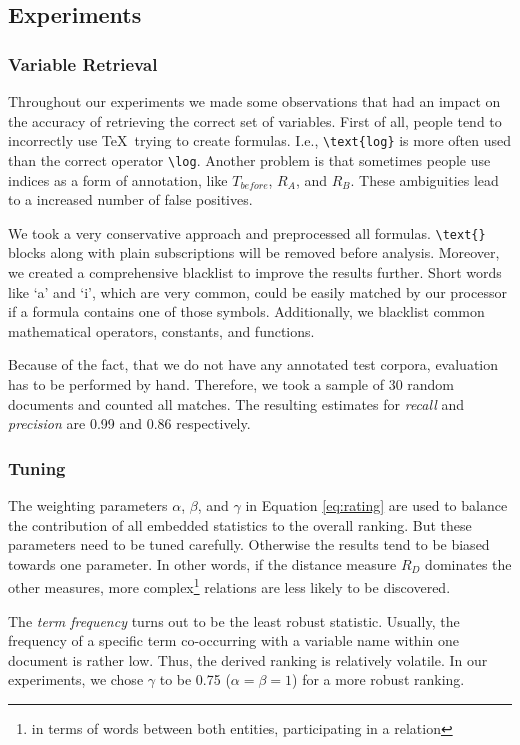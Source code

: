 \documentclass[runningheads]{llncs}
\begin{document}
\subsection{Experiments}

\subsubsection{Variable Retrieval}
\label{vr}
Throughout our experiments we made some observations that had an impact on the accuracy of retrieving the correct set of variables. First of all, people tend to incorrectly use \TeX\ trying to create formulas. I.e., \texttt{\textbackslash text\{log\}} is more often used than the correct operator \texttt{\textbackslash log}. Another problem is that sometimes people use indices as a form of annotation, like $T_{before}$, $R_{A}$, and $R_{B}$. These ambiguities lead to a increased number of false positives.

We took a very conservative approach and preprocessed all formulas. \texttt{\textbackslash text\{\}} blocks along with plain subscriptions will be removed before analysis. Moreover, we created a comprehensive blacklist to improve the results further. Short words like `a' and `i', which are very common, could be easily matched by our processor if a formula contains one of those symbols. Additionally, we blacklist common mathematical operators, constants, and functions.

Because of the fact, that we do not have any annotated test corpora, evaluation has to be performed by hand. Therefore, we took a sample of 30 random documents and counted all matches. The resulting estimates for \emph{recall} and \emph{precision} are 0.99 and 0.86 respectively.



\subsubsection{Tuning}
The weighting parameters $\alpha$, $\beta$, and $\gamma$ in Equation \ref{eq:rating} are used to balance the contribution of all embedded statistics to the overall ranking. But these parameters need to be tuned carefully. Otherwise the results tend to be biased towards one parameter. In other words, if the distance measure $R_{D}$ dominates the other measures, more complex\footnote{in terms of words between both entities, participating in a relation} relations are less likely to be discovered.

The \emph{term frequency} turns out to be the least robust statistic. Usually, the frequency of a specific term co-occurring with a variable name within one document is rather low. Thus, the derived ranking is relatively volatile. In our experiments, we chose $\gamma$ to be 0.75 ($\alpha = \beta = 1$) for a more robust ranking.
\end{document}
